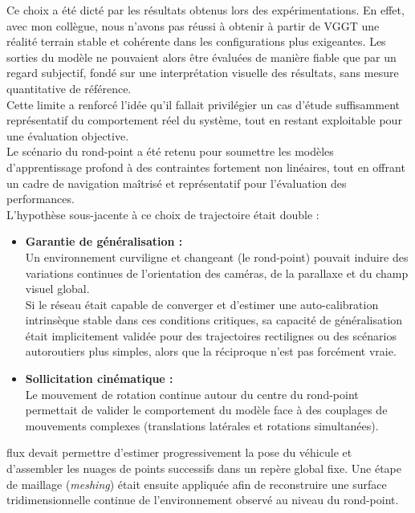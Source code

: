 \documentclass[12pt,a4paper,oneside]{report}
\begin{document}
\hspace*{.5cm}Ce choix a été dicté par les résultats obtenus lors des expérimentations. En effet, avec mon collègue, nous n'avons pas réussi à obtenir à partir de VGGT une réalité terrain stable et cohérente dans les configurations plus exigeantes. Les sorties du modèle ne pouvaient alors être évaluées de manière fiable que par un regard subjectif, fondé sur une interprétation visuelle des résultats, sans mesure quantitative de référence.\\
\hspace*{.5cm}Cette limite a renforcé l'idée qu'il fallait privilégier un cas d'étude suffisamment représentatif du comportement réel du système, tout en restant exploitable pour une évaluation objective. \\
\hspace*{.5cm}Le scénario du rond-point a été retenu pour soumettre les modèles d'apprentissage profond à des contraintes fortement non linéaires, tout en offrant un cadre de navigation maîtrisé et représentatif pour l'évaluation des performances.\\
L'hypothèse sous-jacente à ce choix de trajectoire était double :
\begin{itemize}[itemsep=1em]
    \item \textbf{Garantie de généralisation :}\\
    Un environnement curviligne et changeant (le rond-point) pouvait induire des variations continues de l'orientation des caméras, de la parallaxe et du champ visuel global.\\
    Si le réseau était capable de converger et d'estimer une auto-calibration intrinsèque stable dans ces conditions critiques, sa capacité de généralisation était implicitement validée pour des trajectoires rectilignes ou des scénarios autoroutiers plus simples, alors que la réciproque n'est pas forcément vraie.
    \item \textbf{Sollicitation cinématique :}\\
    Le mouvement de rotation continue autour du centre du rond-point permettait de valider le comportement du modèle face à des couplages de mouvements complexes (translations latérales et rotations simultanées).
\end{itemize}
flux devait permettre d'estimer progressivement la pose du véhicule et d'assembler les nuages de points successifs dans un repère global fixe. Une étape de maillage (\textit{meshing}) était ensuite appliquée afin de reconstruire une surface tridimensionnelle continue de l'environnement observé au niveau du rond-point.
\end{document}
